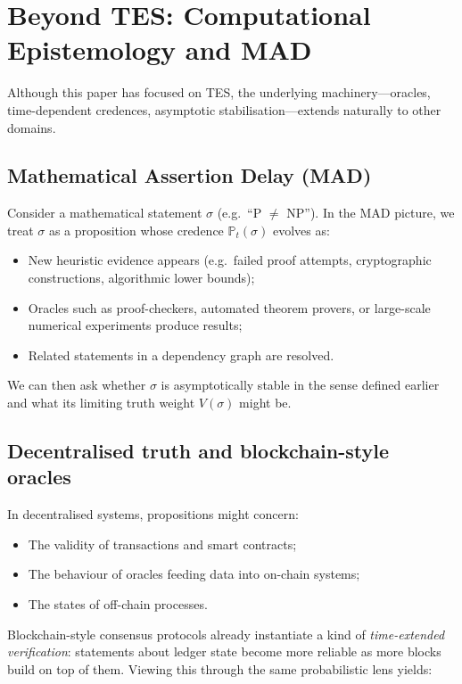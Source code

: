 \documentclass[11pt]{article}
\newcommand{\Pp}{\mathbb{P}}
\newcommand{\1}{\mathbf{1}}
\begin{document}
\section{Beyond TES: Computational Epistemology and MAD}

Although this paper has focused on TES, the underlying machinery---oracles,
time-dependent credences, asymptotic stabilisation---extends naturally to
other domains.

\subsection{Mathematical Assertion Delay (MAD)}

Consider a mathematical statement $\sigma$ (e.g.~\enquote{P $\neq$ NP}).
In the MAD picture, we treat $\sigma$ as a proposition whose credence
$\Pp_t(\sigma)$ evolves as:

\begin{itemize}[leftmargin=2em]
  \item New heuristic evidence appears (e.g.~failed proof attempts,
  cryptographic constructions, algorithmic lower bounds);
  \item Oracles such as proof-checkers, automated theorem provers, or
  large-scale numerical experiments produce results;
  \item Related statements in a dependency graph are resolved.
\end{itemize}

We can then ask whether $\sigma$ is asymptotically stable in the sense defined
earlier and what its limiting truth weight $V(\sigma)$ might be.

\subsection{Decentralised truth and blockchain-style oracles}

In decentralised systems, propositions might concern:

\begin{itemize}[leftmargin=2em]
  \item The validity of transactions and smart contracts;
  \item The behaviour of oracles feeding data into on-chain systems;
  \item The states of off-chain processes.
\end{itemize}

Blockchain-style consensus protocols already instantiate a kind of
\emph{time-extended verification}:
statements about ledger state become more reliable as more blocks build on
top of them.
Viewing this through the same probabilistic lens yields:
\end{document}
